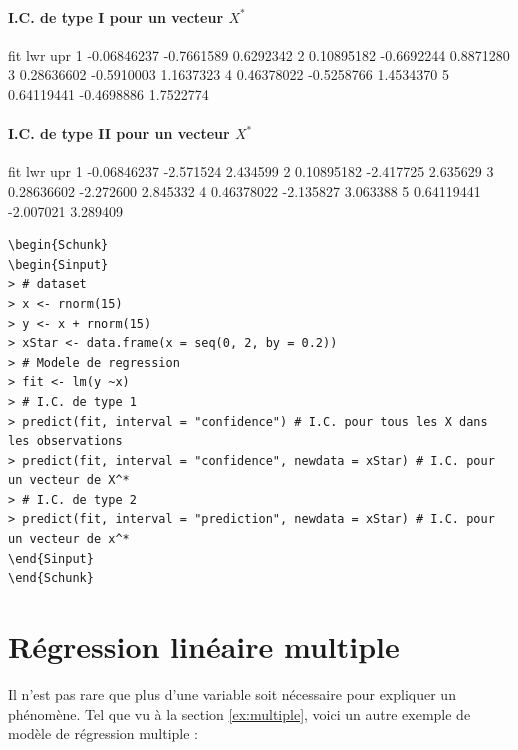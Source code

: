 \documentclass[11pt,french]{report}
\begin{document}
\subsubsection*{I.C. de type I pour un vecteur $X^*$}
\begin{Schunk}
\begin{Soutput}
          fit        lwr       upr
1 -0.06846237 -0.7661589 0.6292342
2  0.10895182 -0.6692244 0.8871280
3  0.28636602 -0.5910003 1.1637323
4  0.46378022 -0.5258766 1.4534370
5  0.64119441 -0.4698886 1.7522774
\end{Soutput}
\end{Schunk}

\subsubsection*{I.C. de type II pour un vecteur $X^*$}
\begin{Schunk}
\begin{Soutput}
          fit       lwr      upr
1 -0.06846237 -2.571524 2.434599
2  0.10895182 -2.417725 2.635629
3  0.28636602 -2.272600 2.845332
4  0.46378022 -2.135827 3.063388
5  0.64119441 -2.007021 3.289409
\end{Soutput}
\end{Schunk}

\begin{lstlisting}[linerange=\\begin\{Sinput\}-\\end\{Sinput\},includerangemarker=false, caption = Code source en R pour l'exemple]
\begin{Schunk}
\begin{Sinput}
> # dataset
> x <- rnorm(15)
> y <- x + rnorm(15)
> xStar <- data.frame(x = seq(0, 2, by = 0.2)) 
> # Modele de regression
> fit <- lm(y ~x)
> # I.C. de type 1
> predict(fit, interval = "confidence") # I.C. pour tous les X dans les observations
> predict(fit, interval = "confidence", newdata = xStar) # I.C. pour un vecteur de X^*
> # I.C. de type 2
> predict(fit, interval = "prediction", newdata = xStar) # I.C. pour un vecteur de x^*
\end{Sinput}
\end{Schunk}
\end{lstlisting}
\bigskip

\chapter{Régression linéaire multiple}
Il n'est pas rare que plus d'une variable soit nécessaire pour expliquer un phénomène. 
Tel que vu à la section \ref{ex:multiple}, voici un autre exemple de modèle de régression multiple :
\end{document}
